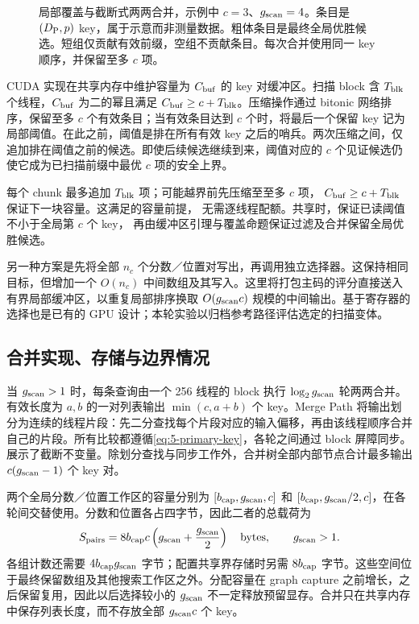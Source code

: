 \begin{figure}[tbp]
\centering

\caption[局部覆盖与截断式两两合并]{局部覆盖与截断式两两合并，示例中 $c=3$、$g_{\mathrm{scan}}=4$。条目是 $(D_{\mathrm{P}},p)$ key，属于示意而非测量数据。粗体条目是最终全局优胜候选。短组仅贡献有效前缀，空组不贡献条目。每次合并使用同一 key 顺序，并保留至多 $c$ 项。}
\label{fig:5-global-selection}
\end{figure}

CUDA 实现在共享内存中维护容量为 $C_{\rm buf}$ 的 key 对缓冲区。扫描 block 含 $T_{\rm blk}$ 个线程，$C_{\rm buf}$ 为二的幂且满足 $C_{\rm buf}\geq c+T_{\rm blk}$。压缩操作通过 bitonic 网络排序，保留至多 $c$ 个有效条目；当有效条目达到 $c$ 个时，将最后一个保留 key 记为局部阈值。在此之前，阈值是排在所有有效 key 之后的哨兵。两次压缩之间，仅追加排在阈值之前的候选。即使后续候选继续到来，阈值对应的 $c$ 个见证候选仍使它成为已扫描前缀中最优 $c$ 项的安全上界。

每个 chunk 最多追加 $T_{\rm blk}$ 项；可能越界前先压缩至至多 $c$ 项，
$C_{\rm buf}\geq c+T_{\rm blk}$ 保证下一块容量。这满足的容量前提，
无需逐线程配额。共享时，保证已读阈值不小于全局第 $c$ 个 key，
再由缓冲区引理与覆盖命题保证过滤及合并保留全局优胜候选。

另一种方案是先将全部 $n_c$ 个分数／位置对写出，再调用独立选择器。这保持相同目标，但增加一个 $O(n_c)$ 中间数组及其写入。这里将打包主码的评分直接送入有界局部缓冲区，以重复局部排序换取 $O(g_{\mathrm{scan}} c)$ 规模的中间输出。基于寄存器的选择也是已有的 GPU 设计\cite{johnson_gpu}；本轮实验以归档参考路径评估选定的扫描变体。

\subsection{合并实现、存储与边界情况}

当 $g_{\mathrm{scan}}>1$ 时，每条查询由一个 256 线程的 block 执行 $\log_2 g_{\mathrm{scan}}$ 轮两两合并。有效长度为 $a,b$ 的一对列表输出 $\min(c,a+b)$ 个 key。Merge Path 将输出划分为连续的线程片段：先二分查找每个片段对应的输入偏移，再由该线程顺序合并自己的片段\cite{gpu_merge_path}。所有比较都遵循\cref{eq:5-primary-key}，各轮之间通过 block 屏障同步。 展示了截断不变量。除划分查找与同步工作外，合并树全部内部节点合计最多输出 $c(g_{\mathrm{scan}}-1)$ 个 key 对。

两个全局分数／位置工作区的容量分别为 $[b_{\rm cap},g_{\mathrm{scan}},c]$ 和 $[b_{\rm cap},g_{\mathrm{scan}}/2,c]$，在各轮间交替使用。分数和位置各占四字节，因此二者的总载荷为
\begin{equation}
 S_{\rm pairs}=8b_{\rm cap}c\left(g_{\mathrm{scan}}+\frac{g_{\mathrm{scan}}}{2}\right)
 \quad\text{bytes},\qquad g_{\mathrm{scan}}>1.
 \label{eq:5-group-workspace}
\end{equation}
各组计数还需要 $4b_{\rm cap}g_{\mathrm{scan}}$ 字节；配置共享界存储时另需 $8b_{\rm cap}$ 字节。这些空间位于最终保留数组及其他搜索工作区之外。分配容量在 graph capture 之前增长，之后保留复用，因此以后选择较小的 $g_{\mathrm{scan}}$ 不一定释放预留显存。合并只在共享内存中保存列表长度，而不存放全部 $g_{\mathrm{scan}} c$ 个 key。

